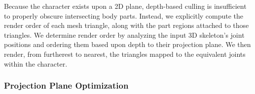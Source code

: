
Because the character exists upon a 2D plane, depth-based culling is insufficient to properly obscure intersecting body parts. Instead, we explicitly compute the render order of each mesh triangle, along with the part regions attached to those triangles. We determine render order by analyzing the input 3D skeleton's joint positions and ordering them based upon depth to their projection plane.
We then render, from furtherest to nearest, the triangles mapped to the equivalent joints within the character.





\subsubsection{Projection Plane Optimization}
\label{ComputeRigJointLocations}

\begin{comment}
\begin{figure*}[ht]
\centering
\texttt{[image: figures/projection.png]}
\caption{A. Example of how the orientation of the character's rig joint, \(\alpha\), is obtained from a 3D bone vector.
B. As the 3D bone vector approaches the normal vector of the projection plane, `flailing' artifacts may occur.
C. An example of two bone configuration, which, after being projected, result in the same orientation \(\alpha\). This results in no change in the character's rig, or `dampening' of the input motion.
Mock figure. Refer to segments as \textit{Silhouette Segements}}
\label{fig:projection}
\end{figure*}
\end{comment}

